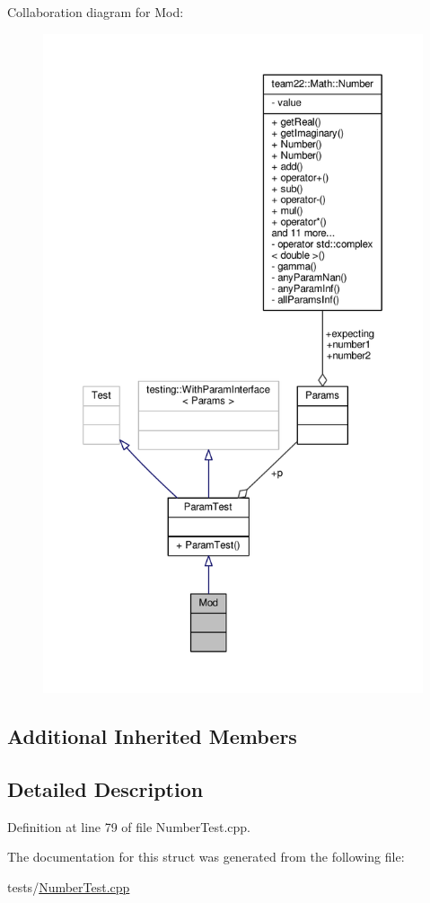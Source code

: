 Collaboration diagram for Mod\+:
\nopagebreak
\begin{figure}[H]
\begin{center}
\leavevmode
\includegraphics[height=550pt]{struct_mod__coll__graph}
\end{center}
\end{figure}
\subsection*{Additional Inherited Members}


\subsection{Detailed Description}


Definition at line 79 of file Number\+Test.\+cpp.



The documentation for this struct was generated from the following file\+:\begin{DoxyCompactItemize}
\item 
tests/\hyperlink{_number_test_8cpp}{Number\+Test.\+cpp}\end{DoxyCompactItemize}
